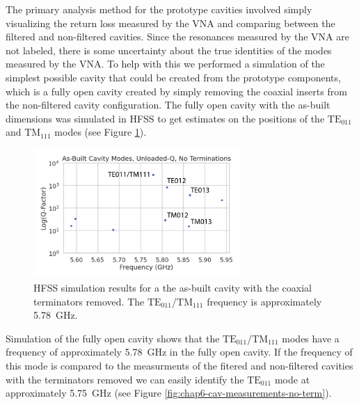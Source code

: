 The primary analysis method for the prototype cavities involved simply visualizing the return loss measured by the VNA and comparing between the filtered and non-filtered cavities. Since the resonances measured by the VNA are not labeled, there is some uncertainty about the true identities of the modes measured by the VNA. To help with this we performed a simulation of the simplest possible cavity that could be created from the prototype components, which is a fully open cavity created by simply removing the coaxial inserts from the non-filtered cavity configuration. The fully open cavity with the as-built dimensions was simulated in HFSS to get estimates on the positions of the $\mathrm{TE}_{011}$ and $\mathrm{TM}_{111}$ modes (see Figure \ref{fig:chap6-fully-open-cavity-sim}).

\begin{figure}[htbp]
    \centering
    \includegraphics*[width=0.7\textwidth]{figs/Chapter-6/230612_simulated_toy_cav_no_term_modes_annotated.png}
    \caption{\label{fig:chap6-fully-open-cavity-sim} HFSS simulation results for a the as-built cavity with the coaxial terminators removed. The $\mathrm{TE}_{011}$/$\mathrm{TM}_{111}$ frequency is approximately 5.78~GHz.}
\end{figure}

Simulation of the fully open cavity shows that the $\mathrm{TE}_{011}$/$\mathrm{TM}_{111}$ modes have a frequency of approximately 5.78~GHz in the fully open cavity. If the frequency of this mode is compared to the measurments of the fitered and non-filtered cavities with the terminators removed we can easily identify the $\mathrm{TE}_{011}$ mode at approximately 5.75~GHz (see Figure \ref{fig:chap6-cav-measurements-no-term}).

